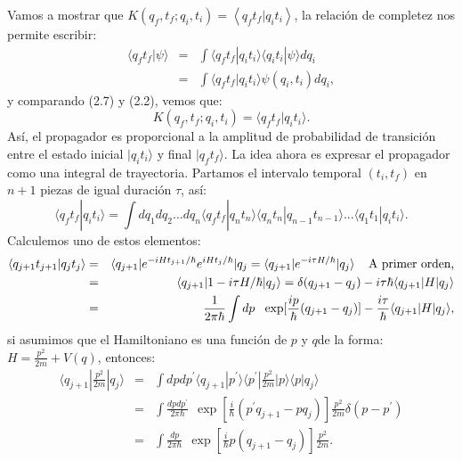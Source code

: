 Vamos a mostrar que $K(q_f,t_f;q_i,t_i)=\left\langle q_ft_f|q_it_i \right\rangle$, la relación de completez nos permite escribir:
\begin{eqnarray}
\nonumber \langle q_ft_f|\psi\rangle &=& \int\langle q_ft_f|q_it_i\rangle\langle q_it_i|\psi\rangle dq_i\\
&=& \int \langle q_ft_f|q_it_i\rangle \psi(q_i,t_i)dq_i ,
\end{eqnarray}
y comparando (2.7) y (2.2), vemos que:
\begin{equation}
K(q_f,t_f;q_i,t_i)=\langle q_ft_f|q_it_i\rangle .
\end{equation}
Así, el propagador es proporcional a la amplitud de probabilidad de transición entre el estado inicial $|q_it_i\rangle$ y final $|q_ft_f\rangle$. La idea ahora es expresar el propagador como una integral de trayectoria. Partamos el intervalo temporal $(t_i,t_f)$ en $n+1$ piezas de igual duración $\tau$, así:
\begin{equation}
\langle q_ft_f|q_it_i\rangle = \int dq_1dq_2...dq_n\langle q_ft_f|q_nt_n\rangle \langle q_nt_n|q_{n-1}t_{n-1}\rangle...\langle q_1t_1|q_it_i\rangle .
\end{equation}
Calculemos uno de estos elementos:
\begin{eqnarray}
\nonumber \langle q_{j+1}t_{j+1}|q_jt_j\rangle &=&\langle q_{j+1}|e^{-iHt_{j+1}/\hbar}e^{iHt_j/\hbar}|q_j=\langle q_{j+1}|e^{-i\tau H/\hbar}|q_j\rangle \hspace{0.4cm}\text{A primer orden,}\\
\nonumber &=&\langle q_{j+1}|1-i\tau H/\hbar|q_j\rangle=\delta(q_{j+1}-q_j)-i\tau\hbar\langle q_{j+1}|H|q_j\rangle\\
&=& \frac{1}{2\pi\hbar}\int dp\ \ \exp[\frac{ip}{\hbar}(q_{j+1}-q_j)]-\frac{i\tau}{\hbar}\langle q_{j+1}|H|q_j\rangle , 
\end{eqnarray}	
si asumimos que el Hamiltoniano es una función de $p$ y $q$de la forma: $H=\frac{p^2}{2m}+V(q)$, entonces:
\begin{eqnarray}
\nonumber \langle q_{j+1}|\frac{p^2}{2m}|q_j \rangle &=& \int dpdp^{\prime} \langle q_{j+1}|p^{\prime}\rangle\langle p^{\prime}|\frac{p^2}{2m}|p\rangle \langle p|q_j \rangle\\
\nonumber &=&\int \frac{dpdp^{\prime}}{2\pi\hbar}\ \ \exp[\frac{i}{\hbar}(p^{\prime} q_{j+1}-pq_j)]\frac{p^2}{2m}\delta(p-p^{\prime})\\
&=& \int \frac{dp}{2\pi\hbar}\ \ \exp[\frac{i}{\hbar}p(q_{j+1}-q_j)]\frac{p^2}{2m} .
\end{eqnarray}
